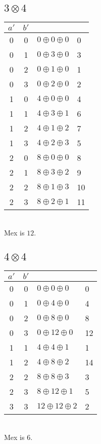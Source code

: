 \documentclass[11pt,twoside]{scrartcl}
\begin{document}
\subsection{$3 \otimes 4$}
\begin{tabular}{cc|l|l}
    $a'$ & $b'$ & & \\ \hline
    0 & 0 & $0 \oplus 0 \oplus 0$ & 0 \\
    0 & 1 & $0 \oplus 3 \oplus 0$ & 3 \\
    0 & 2 & $0 \oplus 1 \oplus 0$ & 1 \\
    0 & 3 & $0 \oplus 2 \oplus 0$ & 2 \\
    1 & 0 & $4 \oplus 0 \oplus 0$ & 4 \\
    1 & 1 & $4 \oplus 3 \oplus 1$ & 6 \\
    1 & 2 & $4 \oplus 1 \oplus 2$ & 7 \\
    1 & 3 & $4 \oplus 2 \oplus 3$ & 5 \\
    2 & 0 & $8 \oplus 0 \oplus 0$ & 8 \\
    2 & 1 & $8 \oplus 3 \oplus 2$ & 9 \\
    2 & 2 & $8 \oplus 1 \oplus 3$ & 10 \\
    2 & 3 & $8 \oplus 2 \oplus 1$ & 11 

\end{tabular}
\ \vspace{6pt} \\ 

Mex is $12$.

\subsection{$4 \otimes 4$}
\begin{tabular}{cc|l|l}
    $a'$ & $b'$ & & \\ \hline
    0 & 0 & $0 \oplus 0 \oplus 0$ & 0 \\
    0 & 1 & $0 \oplus 4 \oplus 0$ & 4 \\
    0 & 2 & $0 \oplus 8 \oplus 0$ & 8 \\
    0 & 3 & $0 \oplus 12 \oplus 0$ & 12 \\
    1 & 1 & $4 \oplus 4 \oplus 1$ & 1 \\
    1 & 2 & $4 \oplus 8 \oplus 2$ & 14 \\
    2 & 2 & $8 \oplus 8 \oplus 3$ & 3 \\ 
    2 & 3 & $8 \oplus 12 \oplus 1$ & 5 \\ 
    3 & 3 & $12 \oplus 12 \oplus 2$ & 2 \\ 

\end{tabular}
\ \vspace{6pt} \\ 
Mex is $6$.
\end{document}
